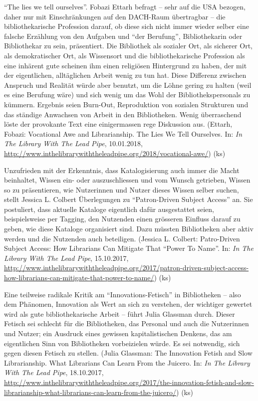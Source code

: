 \documentclass[a4paper,
fontsize=11pt,
oneside,
numbers=noperiodatend,
parskip=half-,
bibliography=totoc,
final
]{scrartcl}
\begin{document}
\enquote{The lies we tell ourselves}. Fobazi Ettarh befragt -- sehr auf
die USA bezogen, daher nur mit Einschränkungen auf den DACH-Raum
übertragbar -- die bibliothekarische Profession darauf, ob diese sich
nicht immer wieder selber eine falsche Erzählung von den Aufgaben und
\enquote{der Berufung}, Bibliothekarin oder Bibliothekar zu sein,
präsentiert. Die Bibliothek als sozialer Ort, als sicherer Ort, als
demokratischer Ort, als Wissensort und die bibliothekarische Profession
als eine inhärent gute scheinen ihm einen religiösen Hintergrund zu
haben, der mit der eigentlichen, alltäglichen Arbeit wenig zu tun hat.
Diese Differenz zwischen Anspruch und Realität würde aber benutzt, um
die Löhne gering zu halten (weil es eine Berufung wäre) und sich wenig
um das Wohl der Bibliothekspersonals zu kümmern. Ergebnis seien
Burn-Out, Reproduktion von sozialen Strukturen und das ständige
Anwachsen von Arbeit in den Bibliotheken. Wenig überraschend löste der
provokante Text eine einigermassen rege Diskussion aus. (Ettarh, Fobazi:
Vocational Awe and Librarianship. The Lies We Tell Ourselves. In:
\emph{In The Library With The Lead Pipe}, 10.01.2018,
\url{http://www.inthelibrarywiththeleadpipe.org/2018/vocational-awe/})
(ks)

Unzufrieden mit der Erkenntnis, dass Katalogisierung auch immer die
Macht beinhaltet, Wissen ein- oder auszuschliessen und vom Wunsch
getrieben, Wissen so zu präsentieren, wie Nutzerinnen und Nutzer dieses
Wissen selber suchen, stellt Jessica L. Colbert Überlegungen zu
\enquote{Patron-Driven Subject Access} an. Sie postuliert, dass aktuelle
Kataloge eigentlich dafür ausgestattet seien, beispielsweise per
Tagging, den Nutzenden einen grösseren Einfluss darauf zu geben, wie
diese Kataloge organisiert sind. Dazu müssten Bibliotheken aber aktiv
werden und die Nutzenden auch beteiligen. (Jessica L. Colbert:
Patro-Driven Subject Access: How Librarians Can Mitigate That
\enquote{Power To Name}. In: \emph{In The Library With The Lead Pipe},
15.10.2017,
\url{http://www.inthelibrarywiththeleadpipe.org/2017/patron-driven-subject-access-how-librarians-can-mitigate-that-power-to-name/})
(ks)

Eine teilweise radikale Kritik am \enquote{Innovations-Fetisch} in
Bibliotheken -- also dem Phänomen, Innovation als Wert an sich zu
verstehen, der wichtiger gewertet wird als gute bibliothekarische Arbeit
-- führt Julia Glassman durch. Dieser Fetisch sei schlecht für die
Bibliotheken, das Personal und auch die Nutzerinnen und Nutzer; ein
Ausdruck eines gewissen kapitalistischen Denkens, das am eigentlichen
Sinn von Bibliotheken vorbeizielen würde. Es sei notwendig, sich gegen
diesen Fetisch zu stellen. (Julia Glassman: The Innovation Fetish and
Slow Librarianship. What Librarians Can Learn From the Juicero. In:
\emph{In The Library With The Lead Pipe}, 18.10.2017,
\url{http://www.inthelibrarywiththeleadpipe.org/2017/the-innovation-fetish-and-slow-librarianship-what-librarians-can-learn-from-the-juicero/})
(ks)
\end{document}
